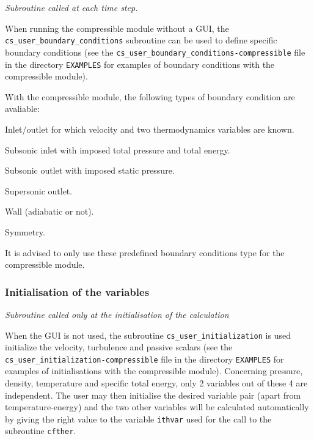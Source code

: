 {{{\noindent
\textit{Subroutine called at each time step.}

When running the compressible module without a GUI, the \texttt{cs\_user\_boundary\_conditions} subroutine can be used to define specific boundary conditions
(see the \texttt{cs\_user\_boundary\_conditions-compressible} file in the directory \texttt{EXAMPLES}
for examples of boundary conditions with the compressible module).

With the compressible module, the following types of boundary condition are avaliable:

\begin{list}{-}{}
  \item Inlet/outlet for which velocity and two thermodynamics variables are known.
  \item Subsonic inlet with imposed total pressure and total energy.
  \item Subsonic outlet with imposed static pressure.
  \item Supersonic outlet.
  \item Wall (adiabatic or not).
  \item Symmetry.
\end{list}

It is advised to only use these predefined boundary conditions type for the compressible module.

\subsubsection{Initialisation of the variables}

\noindent
\textit{Subroutine called only at the initialisation of the calculation}

When the GUI is not used, the subroutine \texttt{cs\_user\_initialization} is used
initialize the velocity, turbulence and passive scalars (see
the \texttt{cs\_user\_initialization-compressible} file in the directory \texttt{EXAMPLES}
for examples of initialisations with the compressible module). Concerning
pressure, density, temperature and specific total energy, only 2 variables out
of these 4 are independent. The user may then initialise the desired variable pair
(apart from temperature-energy) and the two other variables will be
calculated automatically by giving the right value to the variable
\texttt{ithvar} used for the call to the subroutine \texttt{cfther}.

}}}
